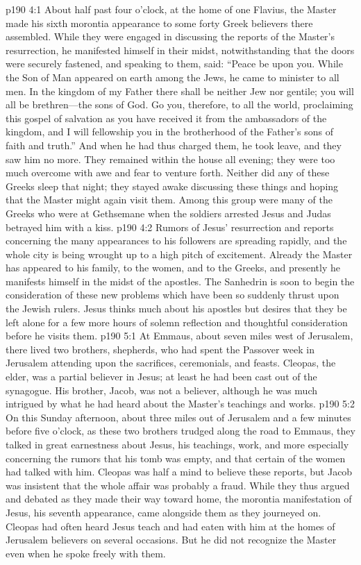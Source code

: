 \vs p190 4:1 About half past four o’clock, at the home of one Flavius, the Master made his sixth morontia appearance to some forty Greek believers there assembled. While they were engaged in discussing the reports of the Master’s resurrection, he manifested himself in their midst, notwithstanding that the doors were securely fastened, and speaking to them, said: \textcolor{ubdarkred}{“Peace be upon you. While the Son of Man appeared on earth among the Jews, he came to minister to all men. In the kingdom of my Father there shall be neither Jew nor gentile; you will all be brethren---the sons of God. Go you, therefore, to all the world, proclaiming this gospel of salvation as you have received it from the ambassadors of the kingdom, and I will fellowship you in the brotherhood of the Father’s sons of faith and truth.”} And when he had thus charged them, he took leave, and they saw him no more. They remained within the house all evening; they were too much overcome with awe and fear to venture forth. Neither did any of these Greeks sleep that night; they stayed awake discussing these things and hoping that the Master might again visit them. Among this group were many of the Greeks who were at Gethsemane when the soldiers arrested Jesus and Judas betrayed him with a kiss.\plusone
\pc \vs p190 4:2 Rumors of Jesus’ resurrection and reports concerning the many appearances to his followers are spreading rapidly, and the whole city is being wrought up to a high pitch of excitement. Already the Master has appeared to his family, to the women, and to the Greeks, and presently he manifests himself in the midst of the apostles. The Sanhedrin is soon to begin the consideration of these new problems which have been so suddenly thrust upon the Jewish rulers. Jesus thinks much about his apostles but desires that they be left alone for a few more hours of solemn reflection and thoughtful consideration before he visits them.
\vs p190 5:1 At Emmaus, about seven miles west of Jerusalem, there lived two brothers, shepherds, who had spent the Passover week in Jerusalem attending upon the sacrifices, ceremonials, and feasts. Cleopas, the elder, was a partial believer in Jesus; at least he had been cast out of the synagogue. His brother, Jacob, was not a believer, although he was much intrigued by what he had heard about the Master’s teachings and works.
\vs p190 5:2 On this Sunday afternoon, about three miles out of Jerusalem and a few minutes before five o’clock, as these two brothers trudged along the road to Emmaus, they talked in great earnestness about Jesus, his teachings, work, and more especially concerning the rumors that his tomb was empty, and that certain of the women had talked with him. Cleopas was half a mind to believe these reports, but Jacob was insistent that the whole affair was probably a fraud. While they thus argued and debated as they made their way toward home, the morontia manifestation of Jesus, his seventh appearance, came alongside them as they journeyed on. Cleopas had often heard Jesus teach and had eaten with him at the homes of Jerusalem believers on several occasions. But he did not recognize the Master even when he spoke freely with them.
